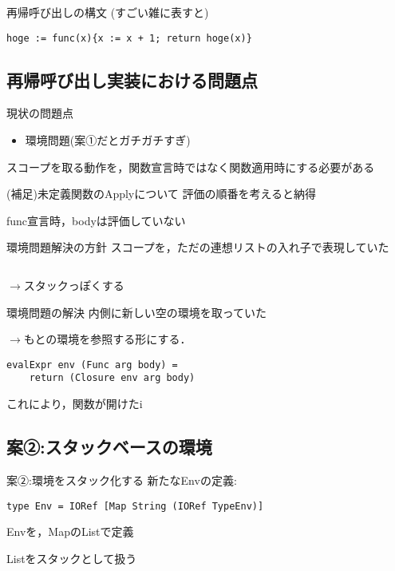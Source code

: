 \documentclass[uplatex,dvipdfmx,ja=standard]{beamer}
\begin{document}
\begin{frame}[fragile]{再帰呼び出しの構文}
    (すごい雑に表すと)
    \begin{verbatim}
hoge := func(x){x := x + 1; return hoge(x)}
    \end{verbatim}

\end{frame}

\subsection{再帰呼び出し実装における問題点}

\begin{frame}{現状の問題点}
    \begin{itemize}
        \item 環境問題(案①だとガチガチすぎ)
    \end{itemize}
スコープを取る動作を，関数宣言時ではなく関数適用時にする必要がある
\end{frame}

\begin{frame}{(補足)未定義関数のApplyについて}
評価の順番を考えると納得

func宣言時，bodyは評価していない
\end{frame}

\begin{frame}[fragile]{環境問題解決の方針}
    スコープを，ただの連想リストの入れ子で表現していた
    \begin{verbatim}
    \end{verbatim}
    $\to$スタックっぽくする
\end{frame}

\begin{frame}[fragile]{環境問題の解決}
    内側に新しい空の環境を取っていた

    $\to$もとの環境を参照する形にする．
    \begin{verbatim}
evalExpr env (Func arg body) = 
    return (Closure env arg body)
    \end{verbatim}

    これにより，関数が開けたi

\end{frame}

\subsection{案②:スタックベースの環境}

\begin{frame}[fragile]{案②:環境をスタック化する}
    新たなEnvの定義:
    \begin{verbatim}
type Env = IORef [Map String (IORef TypeEnv)]
    \end{verbatim}
Envを，MapのListで定義

Listをスタックとして扱う
\end{frame}
\end{document}

